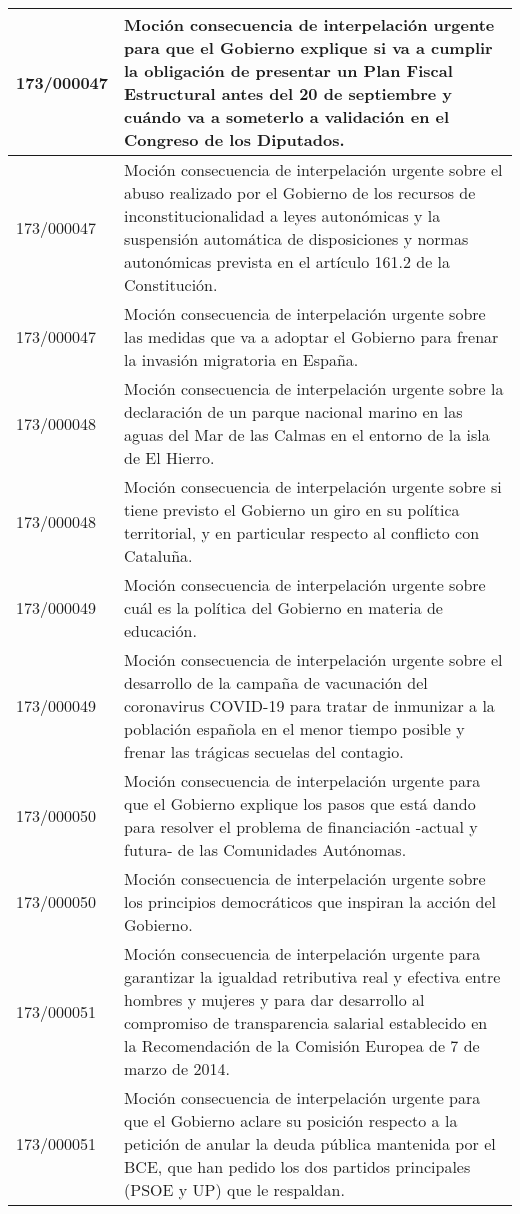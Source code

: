 {\begin{table}[H]
\begin{center}
\begin{tabularx}{\linewidth}{| l | X |}
\hline
173/000047 & Moción consecuencia de interpelación urgente para que el Gobierno explique si va a cumplir la obligación de presentar un Plan Fiscal Estructural antes del 20 de septiembre y cuándo va a someterlo a validación en el Congreso de los Diputados. \\
\hline
173/000047 & Moción consecuencia de interpelación urgente sobre el abuso realizado por el Gobierno de los recursos de inconstitucionalidad a leyes autonómicas y la suspensión automática de disposiciones y normas autonómicas prevista en el artículo 161.2 de la Constitución. \\
\hline
173/000047 & Moción consecuencia de interpelación urgente sobre las medidas que va a adoptar el Gobierno para frenar la invasión migratoria en España. \\
\hline
173/000048 & Moción consecuencia de interpelación urgente sobre la declaración de un parque nacional marino en las aguas del Mar de las Calmas en el entorno de la isla de El Hierro. \\
\hline
173/000048 & Moción consecuencia de interpelación urgente sobre si tiene previsto el Gobierno un giro en su política territorial, y en particular respecto al conflicto con Cataluña. \\
\hline
173/000049 & Moción consecuencia de interpelación urgente sobre cuál es la política del Gobierno en materia de educación. \\
\hline
173/000049 & Moción consecuencia de interpelación urgente sobre el desarrollo de la campaña de vacunación del coronavirus COVID-19 para tratar de inmunizar a la población española en el menor tiempo posible y frenar las trágicas secuelas del contagio. \\
\hline
173/000050 & Moción consecuencia de interpelación urgente para que el Gobierno explique los pasos que está dando para resolver el problema de financiación -actual y futura- de las Comunidades Autónomas. \\
\hline
173/000050 & Moción consecuencia de interpelación urgente sobre los principios democráticos que inspiran la acción del Gobierno. \\
\hline
173/000051 & Moción consecuencia de interpelación urgente para garantizar la igualdad retributiva real y efectiva entre hombres y mujeres y para dar desarrollo al compromiso de transparencia salarial establecido en la Recomendación de la Comisión Europea de 7 de marzo de 2014. \\
\hline
173/000051 & Moción consecuencia de interpelación urgente para que el Gobierno aclare su posición respecto a la petición de anular la deuda pública mantenida por el BCE, que han pedido los dos partidos principales (PSOE y UP) que le respaldan. \\

\end{tabularx}
\end{center}
\end{table}}
